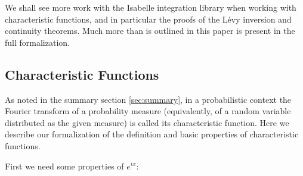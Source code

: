 \documentclass{article}
\theoremstyle{definition}
\begin{document}
\medskip

We shall see more work with the Isabelle integration library when working with characteristic functions, and in particular the proofs of the L\'evy inversion and continuity theorems. Much more than is outlined in this paper is present in the full formalization.

\subsection{Characteristic Functions} \label{sec:char}

As noted in the summary section \ref{sec:summary}, in a probabilistic context the Fourier transform of a probability measure (equivalently, of a random variable distributed as the given measure) is called its characteristic function. Here we describe our formalization of the definition and basic properties of characteristic functions.

First we need some properties of $e^{ix}$:

\medskip
\end{document}
